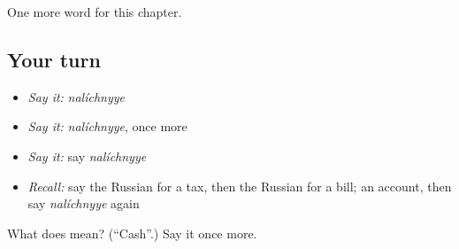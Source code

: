\begin{grammarlens}[title={What you've built}]
One more word for this chapter.
\end{grammarlens}

\subsection*{Your turn}
\begin{itemize}
\raggedright
  \item \emph{Say it:} \emph{nalíchnyye}
  \item \emph{Say it:} \emph{nalíchnyye}, once more
  \item \emph{Say it:} say \emph{nalíchnyye}
  \item \emph{Recall:} say the Russian for a tax, then the Russian for a bill; an account, then say \emph{nalíchnyye} again
\end{itemize}

\begin{tcolorbox}[breakable,colback=teal!4,colframe=teal!35!black,title={Before you move on}]
What does  mean? (\textquotedblleft{}Cash\textquotedblright{}.) Say it once more.
\end{tcolorbox}
